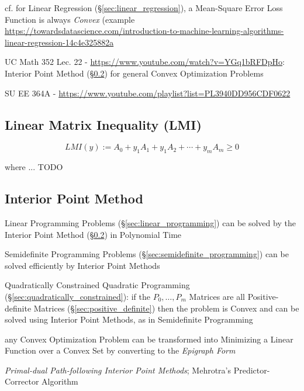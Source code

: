 cf. for Linear Regression (\S\ref{sec:linear_regression}), a Mean-Square Error
Loss Function is always \emph{Convex} (example
\url{https://towardsdatascience.com/introduction-to-machine-learning-algorithms-linear-regression-14c4e325882a}

UC Math 352 Lec. 22 - \url{https://www.youtube.com/watch?v=YGq1bRFDpHo}:
Interior Point Method (\S\ref{sec:interior_point}) for general Convex
Optimization Problems

SU EE 364A - \url{https://www.youtube.com/playlist?list=PL3940DD956CDF0622}



\subsection{Linear Matrix Inequality (LMI)}\label{sec:lmi}

\[
  LMI(y) := A_0 + y_1A_1 + y_1A_2 + \cdots + y_mA_m \geq 0
\]

where ... TODO



\subsection{Interior Point Method}\label{sec:interior_point}

Linear Programming Problems (\S\ref{sec:linear_programming}) can be solved by
the Interior Point Method (\S\ref{sec:interior_point}) in Polynomial Time

Semidefinite Programming Problems (\S\ref{sec:semidefinite_programming})
can be solved efficiently by Interior Point Methods

Quadratically Constrained Quadratic Programming
(\S\ref{sec:quadratically_constrained}): if the $P_0,\ldots,P_m$ Matrices are
all Positive-definite Matrices (\S\ref{sec:positive_definite}) then the problem
is Convex and can be solved using Interior Point Methods, as in Semidefinite
Programming

any Convex Optimization Problem can be transformed into Minimizing a Linear
Function over a Convex Set by converting to the \emph{Epigraph Form}

\emph{Primal-dual Path-following Interior Point Methods}; Mehrotra's
Predictor-Corrector Algorithm

